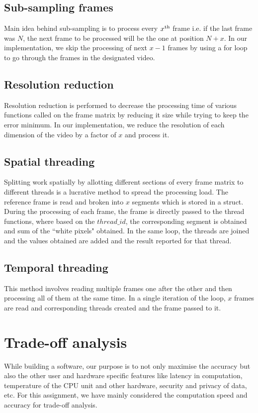 \documentclass{article}
\begin{document}
\subsection{Sub-sampling frames}
Main idea behind sub-sampling is to process every $x\textsuperscript{th}$ frame i.e. if the last frame was $N$, the next frame to be processed will be the one at position $N+x$. In our implementation, we skip the processing of next $x-1$ frames by using a for loop to go through the frames in the designated video.

\subsection{Resolution reduction}
Resolution reduction is performed to decrease the processing time of various functions called on the frame matrix by reducing it size while trying to keep the error minimum. In our implementation, we reduce the resolution of each dimension of the video by a factor of $x$ and process it.

\subsection{Spatial threading}
Splitting work spatially by allotting different sections of every frame matrix to different threads is a lucrative method to spread the processing load. The reference frame is read and broken into $x$ segments which is stored in a struct. During the processing of each frame, the frame is directly passed to the thread functions, where based on the $thread\_id$, the corresponding segment is obtained and sum of the ``white pixels" obtained. In the same loop, the threads are joined and the values obtained are added and the result reported for that thread.

\subsection{Temporal threading}
This method involves reading multiple frames one after the other and then processing all of them at the same time. In a single iteration of the loop, $x$ frames are read and corresponding threads created and the frame passed to it. 

\section{Trade-off analysis}
While building a software, our purpose is to not only maximise the accuracy but also the other user and hardware specific features like latency in computation, temperature of the CPU unit and other hardware, security and privacy of data, etc. For this assignment, we have mainly considered the computation speed and accuracy for trade-off analysis.
\end{document}
